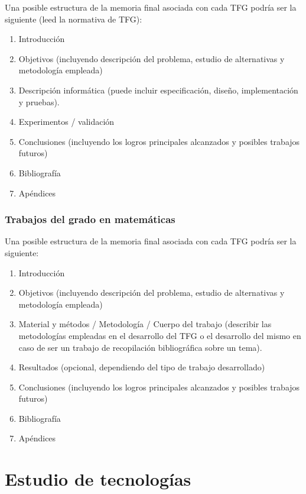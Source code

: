 \documentclass[12pt,twoside,titlepage]{report}
\newcommand\blankpage{%
    \newpage
    \null
    \thispagestyle{empty}%
    \newpage}
\begin{document}
Una posible estructura de la memoria final asociada con cada TFG podría ser la siguiente (leed la normativa de TFG):
\begin{enumerate}
 \item Introducción
 \item Objetivos (incluyendo descripción del problema, estudio de alternativas y metodología empleada)
 \item Descripción informática (puede incluir especificación, diseño, implementación y pruebas).
 \item Experimentos / validación
 \item Conclusiones (incluyendo los logros principales alcanzados y posibles trabajos futuros)
 \item Bibliografía
 \item Apéndices
\end{enumerate}


\subsection{Trabajos del grado en matemáticas}

Una posible estructura de la memoria final asociada con cada TFG podría ser la siguiente:
\begin{enumerate}
 \item Introducción
 \item Objetivos (incluyendo descripción del problema, estudio de alternativas y metodología empleada)
 \item Material y métodos / Metodología / Cuerpo del trabajo (describir las metodologías empleadas en el desarrollo del TFG o el desarrollo del mismo en caso de ser un trabajo de recopilación bibliográfica sobre un tema).
 \item Resultados (opcional, dependiendo del tipo de trabajo desarrollado)
 \item Conclusiones (incluyendo los logros principales alcanzados y posibles trabajos futuros)
 \item Bibliografía
 \item Apéndices
\end{enumerate}




\chapter{Estudio de tecnologías}
\end{document}
